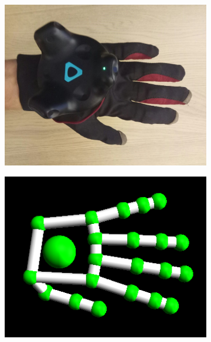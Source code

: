 \documentclass[hyperref, bachelorofscience]{cgvpub}
\begin{document}
\begin{figure}
\begin{subfigure}{.235\linewidth}
		\includegraphics[width=\linewidth]{../pics/hand_dorsal_flat}
	\end{subfigure}
	\hspace{.01cm}
	\begin{subfigure}{.235\linewidth}
		\includegraphics[width=\linewidth]{../pics/model_dorsal_flat}
	\end{subfigure}
	\vspace{.1cm}
	\begin{subfigure}{.235\linewidth}

\end{subfigure}
\end{figure}
\end{document}
